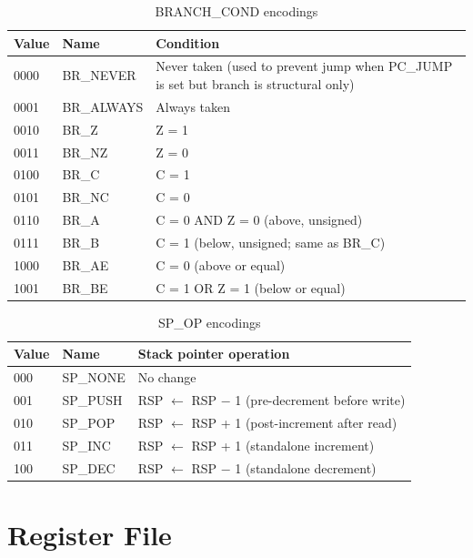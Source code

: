 \documentclass[a4paper,12pt]{report}
\begin{document}
\begin{table}[htbp]
\centering
\caption{BRANCH\_COND encodings}
\label{tab:branchcond}
\begin{tabularx}{\textwidth}{llX}
\toprule
\textbf{Value} & \textbf{Name} & \textbf{Condition} \\
\midrule
0000 & BR\_NEVER & Never taken (used to prevent jump when PC\_JUMP is set but branch is structural only) \\
0001 & BR\_ALWAYS & Always taken \\
0010 & BR\_Z      & Z = 1 \\
0011 & BR\_NZ     & Z = 0 \\
0100 & BR\_C      & C = 1 \\
0101 & BR\_NC     & C = 0 \\
0110 & BR\_A      & C = 0 AND Z = 0 (above, unsigned) \\
0111 & BR\_B      & C = 1 (below, unsigned; same as BR\_C) \\
1000 & BR\_AE     & C = 0 (above or equal) \\
1001 & BR\_BE     & C = 1 OR Z = 1 (below or equal) \\
\bottomrule
\end{tabularx}
\end{table}

\begin{table}[htbp]
\centering
\caption{SP\_OP encodings}
\label{tab:spop}
\begin{tabularx}{\textwidth}{llX}
\toprule
\textbf{Value} & \textbf{Name} & \textbf{Stack pointer operation} \\
\midrule
000 & SP\_NONE & No change \\
001 & SP\_PUSH & RSP $\leftarrow$ RSP $-$ 1 (pre-decrement before write) \\
010 & SP\_POP  & RSP $\leftarrow$ RSP + 1 (post-increment after read) \\
011 & SP\_INC  & RSP $\leftarrow$ RSP + 1 (standalone increment) \\
100 & SP\_DEC  & RSP $\leftarrow$ RSP $-$ 1 (standalone decrement) \\
\bottomrule
\end{tabularx}
\end{table}

\chapter{Register File}
\label{app:registers}
\end{document}
